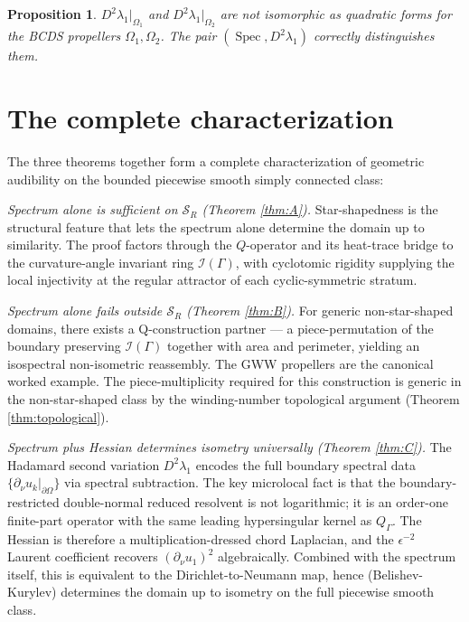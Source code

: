 \documentclass[11pt,reqno]{amsart}
\theoremstyle{plain}
\newtheorem{proposition}[theorem]{Proposition}
\theoremstyle{definition}
\theoremstyle{remark}
\DeclareMathOperator{\Spec}{Spec}
\newcommand{\Scal}{\mathcal{S}}
\newcommand{\Qop}{Q}
\newcommand{\Icalbb}{\mathcal{I}}
\begin{document}
\begin{proposition}\label{prop:hadamard-distinguishes-master}
$D^2\lambda_1|_{\Omega_1}$ and $D^2\lambda_1|_{\Omega_2}$ are not isomorphic as quadratic forms for the BCDS propellers $\Omega_1, \Omega_2$. The pair $(\Spec, D^2\lambda_1)$ correctly distinguishes them.
\end{proposition}

\section{The complete characterization}\label{sec:complete-picture}

The three theorems together form a complete characterization of geometric audibility on the bounded piecewise smooth simply connected class:

\emph{Spectrum alone is sufficient on $\Scal_R$ (Theorem \ref{thm:A}).} Star-shapedness is the structural feature that lets the spectrum alone determine the domain up to similarity. The proof factors through the $\Qop$-operator and its heat-trace bridge to the curvature-angle invariant ring $\Icalbb(\Gamma)$, with cyclotomic rigidity supplying the local injectivity at the regular attractor of each cyclic-symmetric stratum.

\emph{Spectrum alone fails outside $\Scal_R$ (Theorem \ref{thm:B}).} For generic non-star-shaped domains, there exists a Q-construction partner — a piece-permutation of the boundary preserving $\Icalbb(\Gamma)$ together with area and perimeter, yielding an isospectral non-isometric reassembly. The GWW propellers are the canonical worked example. The piece-multiplicity required for this construction is generic in the non-star-shaped class by the winding-number topological argument (Theorem \ref{thm:topological}).

\emph{Spectrum plus Hessian determines isometry universally (Theorem \ref{thm:C}).} The Hadamard second variation $D^2\lambda_1$ encodes the full boundary spectral data $\{\partial_\nu u_k|_{\partial\Omega}\}$ via spectral subtraction. The key microlocal fact is that the boundary-restricted double-normal reduced resolvent is not logarithmic; it is an order-one finite-part operator with the same leading hypersingular kernel as $\Qop_\Gamma$. The Hessian is therefore a multiplication-dressed chord Laplacian, and the $\epsilon^{-2}$ Laurent coefficient recovers $(\partial_\nu u_1)^2$ algebraically. Combined with the spectrum itself, this is equivalent to the Dirichlet-to-Neumann map, hence (Belishev-Kurylev) determines the domain up to isometry on the full piecewise smooth class.
\end{document}
